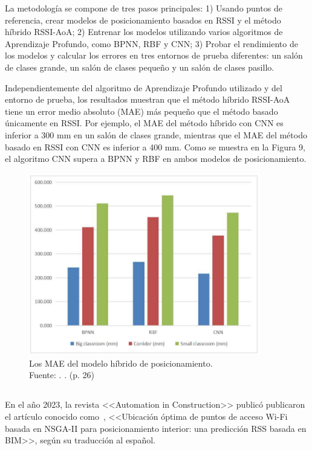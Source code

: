 La metodología se compone de tres pasos principales: 1) Usando puntos de referencia, crear modelos de posicionamiento basados en RSSI y el método híbrido RSSI-AoA; 2) Entrenar los modelos utilizando varios algoritmos de Aprendizaje Profundo, como BPNN, RBF y CNN; 3) Probar el rendimiento de los modelos y calcular los errores en tres entornos de prueba diferentes: un salón de clases grande, un salón de clases pequeño y un salón de clases pasillo.

Independientemente del algoritmo de Aprendizaje Profundo utilizado y del entorno de prueba, los resultados muestran que el método híbrido RSSI-AoA tiene un error medio absoluto (MAE) más pequeño que el método basado únicamente en RSSI. Por ejemplo, el MAE del método híbrido con CNN es inferior a 300 mm en un salón de clases grande, mientras que el MAE del método basado en RSSI con CNN es inferior a 400 mm. Como se muestra en la Figura 9, el algoritmo CNN supera a BPNN y RBF en ambos modelos de posicionamiento.

\begin{figure}[!ht]
	\begin{center}
		\includegraphics[width=0.90\textwidth]{2/figures/cai2023.png}
		\caption[Los MAE del modelo híbrido de posicionamiento]{Los MAE del modelo híbrido de posicionamiento.\\
			Fuente: \cite{pr_cai2023precisewifi}. . (p. 26)}
		\label{2:fig117}
	\end{center}
\end{figure}

\subsection{}
En el año 2023, la revista <<Automation in Construction>> publicó \cite{pr_hosseini2023NSGAIIap} publicaron el artículo conocido como , <<Ubicación óptima de puntos de acceso Wi-Fi basada en NSGA-II para posicionamiento interior: una predicción RSS basada en BIM>>, según su traducción al español.

